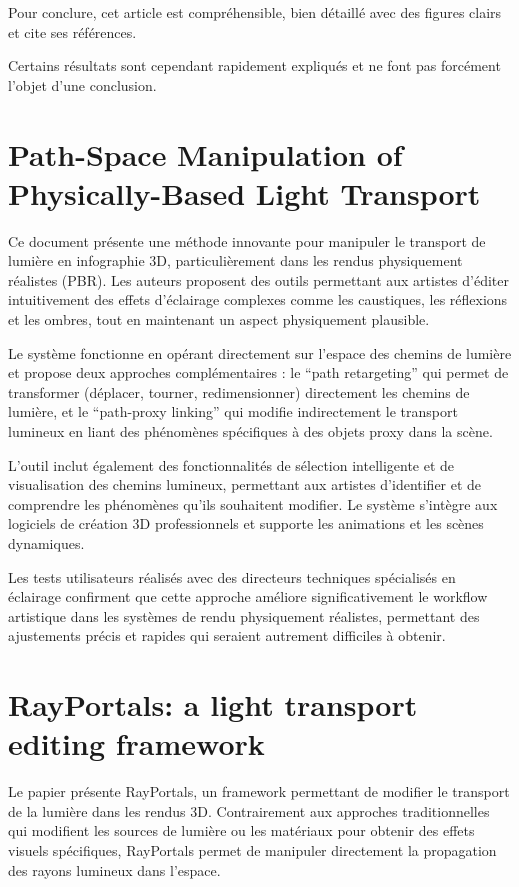 \documentclass[runningheads]{llncs}
\begin{document}
Pour conclure, cet article est compréhensible, bien détaillé avec des figures clairs et cite ses références.

Certains résultats sont cependant rapidement expliqués et ne font pas forcément l’objet d’une conclusion.

\newpage
\section{Path-Space Manipulation of Physically-Based Light Transport}
Ce document présente une méthode innovante pour manipuler le transport de lumière en infographie 3D, particulièrement dans les rendus physiquement réalistes (PBR). Les auteurs proposent des outils permettant aux artistes d'éditer intuitivement des effets d'éclairage complexes comme les caustiques, les réflexions et les ombres, tout en maintenant un aspect physiquement plausible.

Le système fonctionne en opérant directement sur l'espace des chemins de lumière et propose deux approches complémentaires : le ``path retargeting'' qui permet de transformer (déplacer, tourner, redimensionner) directement les chemins de lumière, et le ``path-proxy linking'' qui modifie indirectement le transport lumineux en liant des phénomènes spécifiques à des objets proxy dans la scène. 

L'outil inclut également des fonctionnalités de sélection intelligente et de visualisation des chemins lumineux, permettant aux artistes d'identifier et de comprendre les phénomènes qu'ils souhaitent modifier. Le système s'intègre aux logiciels de création 3D professionnels et supporte les animations et les scènes dynamiques.

Les tests utilisateurs réalisés avec des directeurs techniques spécialisés en éclairage confirment que cette approche améliore significativement le workflow artistique dans les systèmes de rendu physiquement réalistes, permettant des ajustements précis et rapides qui seraient autrement difficiles à obtenir.

\section{RayPortals: a light transport editing framework}
Le papier présente RayPortals, un framework permettant de modifier le transport de la lumière dans les rendus 3D. Contrairement aux approches traditionnelles qui modifient les sources de lumière ou les matériaux pour obtenir des effets visuels spécifiques, RayPortals permet de manipuler directement la propagation des rayons lumineux dans l'espace.
\end{document}
